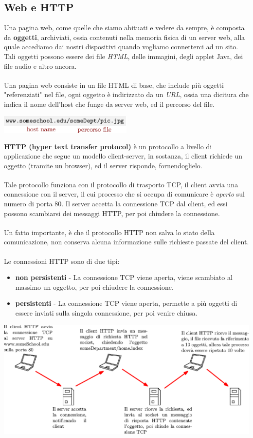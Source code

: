 \documentclass[12pt, letterpaper]{article}
\newcommand{\acc}{\\\hphantom{}\\}
\begin{document}
\subsection{Web e HTTP}
Una pagina web, come quelle che siamo abituati e vedere da sempre, è composta da \textbf{oggetti}, archiviati,
ossia contenuti nella memoria fisica di un server web, alla quale accediamo dai nostri dispositivi quando vogliamo
connetterci ad un sito. Tali oggetti possono essere dei file \textit{HTML}, delle immagini, degli
applet Java, dei file audio e altro ancora.\acc
Una pagina web consiste in un file HTML di base, che include più oggetti "referenziati" nel file, ogni oggetto
è indirizzato da un \textit{URL}, ossia una dicitura che indica il nome dell'host che funge da
server web, ed il percorso del file.\begin{center}
    \includegraphics[width=0.5\textwidth ]{images/url.eps}
\end{center}
\textbf{HTTP (hyper text transfer protocol)} è un protocollo a livello di applicazione che segue un
modello client-server, in sostanza, il client richiede un oggetto (tramite un browser), ed il server
risponde, fornendoglielo.   \acc Tale protocollo funziona con il protocollo di trasporto TCP, il client avvia una
connessione con il server, il cui processo che si occupa di comunicare è \textit{aperto} sul numero di
porta 80. Il server accetta la connessione TCP dal client, ed essi possono scambiarsi dei messaggi
HTTP, per poi chiudere la connessione.\acc
Un fatto importante, è che il protocollo HTTP non salva lo stato della comunicazione, non conserva alcuna
informazione sulle richieste passate del client.\acc
Le connessioni HTTP sono di due tipi:\begin{itemize}
    \item \textbf{non persistenti} - La connessione TCP viene aperta, viene scambiato al massimo un oggetto,
          per poi chiudere la connessione.
    \item \textbf{persistenti} - La connessione TCP viene aperta, permette a più oggetti di essere inviati
          sulla singola connessione, per poi venire chiusa.
\end{itemize}\begin{center}
    \includegraphics[width=1\textwidth ]{images/httpnonPersistente.eps}
\end{center}
\end{document}
